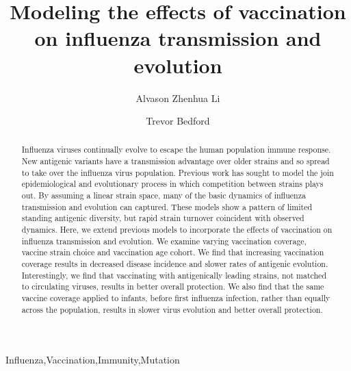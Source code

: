 \documentclass[preprint,12pt]{elsarticle}
\begin{document}
\begin{frontmatter}


\title{Modeling the effects of vaccination on influenza transmission and evolution}


\author{Alvason Zhenhua Li}

\author{Trevor Bedford}


\address{Vaccine and Infectious Disease Division, Fred Hutchinson Cancer Research Center, Seattle, WA 98109, USA}


\begin{abstract}
Influenza viruses continually evolve to escape the human population immune response.
New antigenic variants have a transmission advantage over older strains and so spread to take over the influenza virus population.
Previous work has sought to model the join epidemiological and evolutionary process in which competition between strains plays out.
By assuming a linear strain space, many of the basic dynamics of influenza transmission and evolution can captured.
These models show a pattern of limited standing antigenic diversity, but rapid strain turnover coincident with observed dynamics.
Here, we extend previous models to incorporate the effects of vaccination on influenza transmission and evolution.
We examine varying vaccination coverage, vaccine strain choice and vaccination age cohort.
We find that increasing vaccination coverage results in decreased disease incidence and slower rates of antigenic evolution.
Interestingly, we find that vaccinating with antigenically leading strains, not matched to circulating viruses, results in better overall protection.
We also find that the same vaccine coverage applied to infants, before first influenza infection, rather than equally across the population, results in slower virus evolution and better overall protection.
\end{abstract}

\begin{keyword}
Influenza\sep Vaccination\sep Immunity\sep Mutation
\end{keyword}

\end{frontmatter}
\end{document}
